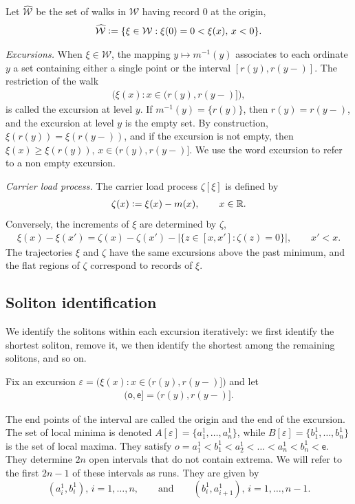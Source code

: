 \documentclass[12pt]{article}
\numberwithin{equation}{section}
\newcommand{\parrafo}[1]{{\noindent \emph{#1}\;\;}}
\newcommand{\RR}{\mathbb R}
\newcommand{\cW}{\mathcal W}
\newcommand{\se}{{\mathsf{e}}}
\newcommand{\so}{{\mathsf{o}}}
\newcommand{\hcW}{\widehat{\cW}}
\newcommand{\eps}{\varepsilon}
\begin{document}
Let $\hcW$ be the set of walks in $\cW$ having record $0$ at the origin,
\begin{align}
  \label{hcW}
  \hcW \vcentcolon = \{\xi\in \cW: \xi(0)=0<\xi(x),\,x<0 \}.
\end{align}



\parrafo{Excursions.} When $\xi\in\cW$, the mapping $y\mapsto m^{-1}(y)$ associates to each ordinate $y$ a set containing either a single point or the interval $[r(y), r(y-)]$. The restriction of the walk
\begin{align}
  \label{ex29}
 \big (\xi(x):x\in (r(y), r(y-)]\bigr), 
\end{align}
is called the excursion at level $y$. If $m^{-1}(y)=\{r(y)\}$, then $r(y)=r(y-)$, and the excursion at level $y$ is the empty set. By construction, $\xi(r(y))=\xi(r(y-))$, and if the excursion is not empty, then $\xi(x)\ge \xi(r(y)),\,x\in (r(y), r(y-)]$. We use the word excursion to refer to a non empty excursion.


\parrafo{Carrier load process.} The carrier load process $\zeta[\xi]$ is defined by
\begin{align}
  \label{clp1}
  \zeta(x) \vcentcolon = \xi(x)-m(x), \qquad x\in\RR.
\end{align}
Conversely, 
the increments of $\xi$ are determined by $\zeta$,
\begin{align}
  \label{4}
  \xi(x)-\xi(x') = \zeta(x)-\zeta(x')- |\{z\in [x,x']:\zeta(z)=0\}|,\qquad x'<x.
\end{align}
The trajectories $\xi$ and $\zeta$ have the same excursions above the past minimum, and the flat regions of $\zeta$ correspond to records of $\xi$.

\subsection{Soliton identification}
\label{siw3}

We identify the solitons within each excursion iteratively: we first identify the shortest soliton, remove it, we then identify the shortest among the remaining solitons, and so on.

Fix an excursion $\eps=\big (\xi(x):x\in (r(y), r(y-)]\bigr)$ and let
\begin{align}
  \label{9}
(\so,\se]=(r(y), r(y-)]. 
\end{align}

The end points of the interval are called the origin and the end of the excursion.
The set of local minima is denoted  $A[\eps]=\{a_1^1, \dots, a_n^1\}$, while $B[\eps]=\{b_1^1, \dots, b_n^1\}$ is the set of local maxima.
They satisfy $o=a_1^1<b_1^1<a_2^1<\dots<a_n^1<b_n^1<\se$. They determine $2n$ open intervals that do not contain extrema. We will refer to the first $2n-1$ of these intervals as runs. They are given by
\begin{equation*}
(a_i^1, b_i^1),\,i=1, \dots, n, \qquad\text{and}\qquad (b_i^1,a_{i+1}^1), \, i=1, \dots, n-1.
\end{equation*}
\end{document}
